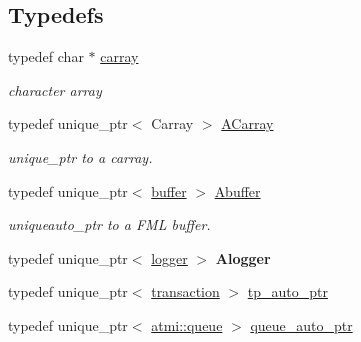 \subsection*{Typedefs}
\begin{DoxyCompactItemize}
\item 
\hypertarget{namespaceatmi_a8b57f9a4e2453d8e5d82ac0016e35e87}{}typedef char $\ast$ \hyperlink{namespaceatmi_a8b57f9a4e2453d8e5d82ac0016e35e87}{carray}\label{namespaceatmi_a8b57f9a4e2453d8e5d82ac0016e35e87}

\begin{DoxyCompactList}\small\item\em character array \end{DoxyCompactList}\item 
\hypertarget{namespaceatmi_a6a5684ecc071e7a5ef8a67c9c1247758}{}typedef unique\+\_\+ptr$<$ Carray $>$ \hyperlink{namespaceatmi_a6a5684ecc071e7a5ef8a67c9c1247758}{A\+Carray}\label{namespaceatmi_a6a5684ecc071e7a5ef8a67c9c1247758}

\begin{DoxyCompactList}\small\item\em unique\+\_\+ptr to a carray. \end{DoxyCompactList}\item 
\hypertarget{namespaceatmi_a268bae34ffaa2c2e72fabbcb54841934}{}typedef unique\+\_\+ptr$<$ \hyperlink{classatmi_1_1buffer}{buffer} $>$ \hyperlink{namespaceatmi_a268bae34ffaa2c2e72fabbcb54841934}{Abuffer}\label{namespaceatmi_a268bae34ffaa2c2e72fabbcb54841934}

\begin{DoxyCompactList}\small\item\em uniqueauto\+\_\+ptr to a F\+M\+L buffer. \end{DoxyCompactList}\item 
\hypertarget{namespaceatmi_ab58c19780ca31f0a223e218226fdf7a5}{}typedef unique\+\_\+ptr$<$ \hyperlink{classatmi_1_1logger}{logger} $>$ {\bfseries Alogger}\label{namespaceatmi_ab58c19780ca31f0a223e218226fdf7a5}

\item 
typedef unique\+\_\+ptr$<$ \hyperlink{classatmi_1_1transaction}{transaction} $>$ \hyperlink{namespaceatmi_a4a71d76e59908eb5ec5e53269c2742b5}{tp\+\_\+auto\+\_\+ptr}
\item 
typedef unique\+\_\+ptr$<$ \hyperlink{classatmi_1_1queue}{atmi\+::queue} $>$ \hyperlink{namespaceatmi_a9eff55eddc901da817f1b087613b18cc}{queue\+\_\+auto\+\_\+ptr}
\end{DoxyCompactItemize}
